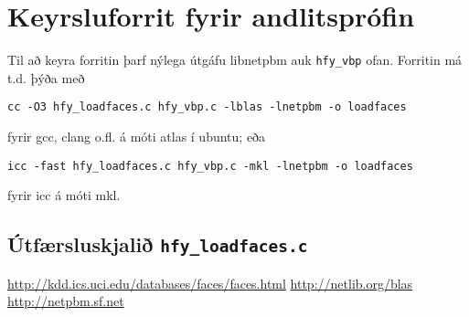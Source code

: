 \documentclass[a4paper,icelandic]{article}
\begin{document}
\section{Keyrsluforrit fyrir andlitsprófin}
Til að keyra forritin þarf nýlega útgáfu libnetpbm \cite{netpbm} auk
\texttt{hfy\_vbp} ofan. Forritin má t.d. þýða með
\begin{verbatim}
cc -O3 hfy_loadfaces.c hfy_vbp.c -lblas -lnetpbm -o loadfaces 
\end{verbatim}
fyrir gcc, clang o.fl. á móti atlas í ubuntu; eða
\begin{verbatim}
icc -fast hfy_loadfaces.c hfy_vbp.c -mkl -lnetpbm -o loadfaces 
\end{verbatim}
fyrir icc á móti mkl.

\subsection{Útfærsluskjalið \texttt{hfy\_loadfaces.c}}


\begin{thebibliography}{99}
   \url{http://kdd.ics.uci.edu/databases/faces/faces.html}
   \url{http://netlib.org/blas}
   \url{http://netpbm.sf.net}
\end{thebibliography}
\end{document}

